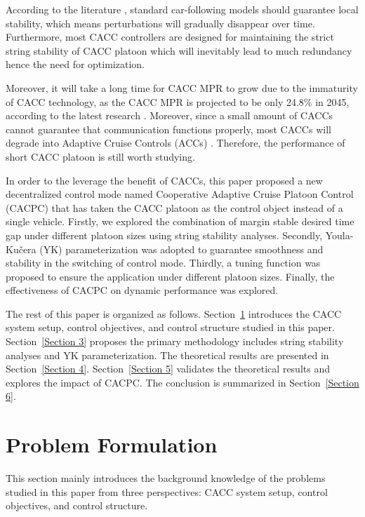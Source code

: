 \documentclass[a4paper,fleqn]{cas-sc}
\begin{document}
According to the literature \citep{qin2018stability,ruan2021stability}, standard car-following models should guarantee local stability, which means perturbations will gradually disappear over time. Furthermore, most CACC controllers are designed for maintaining the strict string stability of CACC platoon \citep{wang2018infrastructure,sun2018stability,ploeg2013lp} which will inevitably lead to much redundancy hence the need for optimization.

Moreover, it will take a long time for CACC MPR to grow due to the immaturity of CACC technology, as the CACC MPR is projected to be only 24.8\% in 2045, according to the latest research \citep{Bansal2017}. Moreover, since a small amount of CACCs cannot guarantee that communication functions properly, most CACCs will degrade into Adaptive Cruise Controls (ACCs) \citep{ruan2021stability,qin2018stability}. Therefore, the performance of short CACC platoon is still worth studying.

In order to the leverage the benefit of CACCs, this paper proposed a new decentralized control mode named Cooperative Adaptive Cruise Platoon Control (CACPC) that has taken the CACC platoon as the control object instead of a single vehicle. Firstly, we explored the combination of margin stable desired time gap under different platoon sizes using string stability analyses. Secondly, Youla-Kučera (YK) parameterization was adopted to guarantee smoothness and stability in the switching of control mode. Thirdly, a tuning function was proposed to ensure the application under different platoon sizes. Finally, the effectiveness of CACPC on dynamic performance was explored.

The rest of this paper is organized as follows. Section~\ref{Section 2} introduces the CACC system setup, control objectives, and control structure studied in this paper. Section~\ref{Section 3} proposes the primary methodology includes string stability analyses and YK parameterization. The theoretical results are presented in Section~\ref{Section 4}. Section~\ref{Section 5} validates the theoretical results and explores the impact of CACPC. The conclusion is summarized in Section~\ref{Section 6}.

\section{Problem Formulation}
\label{Section 2}
This section mainly introduces the background knowledge of the problems studied in this paper from three perspectives: CACC system setup, control objectives, and control structure.
\end{document}
